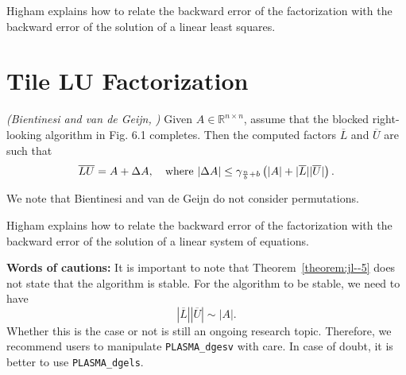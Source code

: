 Higham explains how to relate the backward error of the factorization
with the backward error of the solution of a linear least squares.

\section{Tile LU Factorization}

\begin{theorem}\emph{(Bientinesi and van de Geijn, \cite[Th.6.5]{Bientinesi:2009:SDS})}
Given $A\in \mathbb{R}^{n\times n}$, assume that the blocked right-looking algorithm in Fig. 6.1 completes.
Then the computed factors $\overline{L}$ and $\overline{U}$ are such that 
\begin{equation*}
\label{theorem:jl--5}
\overline{L}\overline{U} =  A + \Delta A, \quad \textmd{where } | \Delta A | \leq \gamma_{\frac{n}{b}+b} \left( | A | + |\overline{L}||\overline{U}| \right).
\end{equation*}
\end{theorem}

We note that Bientinesi and van de Geijn do not consider permutations.

Higham explains how to relate the backward error of the factorization
with the backward error of the solution of a linear system of equations.

{\bf Words of cautions:} It is important to note that Theorem~\ref{theorem:jl--5} does not state that the algorithm is stable.
For the algorithm to be stable, we need to have
\begin{equation*}
 |\overline{L}||\overline{U}| \sim | A |.
\end{equation*}
Whether this is the case or not is still an ongoing research topic.
Therefore, we recommend users to manipulate \texttt{PLASMA\_dgesv} with care.
In case of doubt, it is better to use  \texttt{PLASMA\_dgels}.
